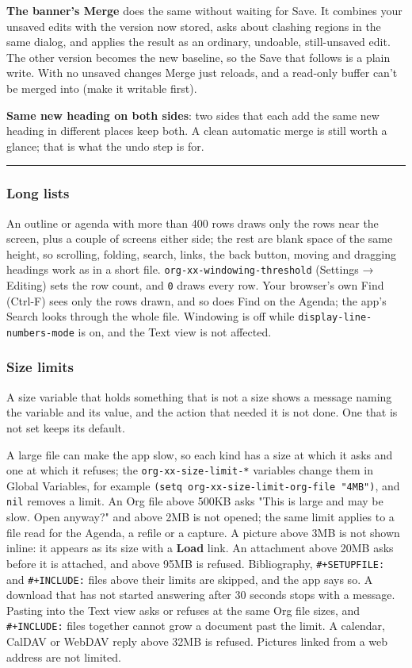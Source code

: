 \documentclass[11pt]{article}
\begin{document}
\textbf{The banner's Merge} does the same without waiting for Save. It combines your unsaved edits with the version now stored, asks about clashing regions in the same dialog, and applies the result as an ordinary, undoable, still-unsaved edit. The other version becomes the new baseline, so the Save that follows is a plain write. With no unsaved changes Merge just reloads, and a read-only buffer can't be merged into (make it writable first).

\textbf{Same new heading on both sides}: two sides that each add the same new heading in different places keep both. A clean automatic merge is still worth a glance; that is what the undo step is for.

\noindent\rule{\textwidth}{0.5pt}

\subsubsection{Long lists}
\label{sec:orgff76d85}
An outline or agenda with more than 400 rows draws only the rows near the screen, plus a couple of screens either side; the rest are blank space of the same height, so scrolling, folding, search, links, the back button, moving and dragging headings work as in a short file. \texttt{org-xx-windowing-threshold} (Settings → Editing) sets the row count, and \texttt{0} draws every row. Your browser's own Find (Ctrl-F) sees only the rows drawn, and so does Find on the Agenda; the app's Search looks through the whole file. Windowing is off while \texttt{display-line-numbers-mode} is on, and the Text view is not affected.

\subsubsection{Size limits}
\label{sec:orgd916704}
A size variable that holds something that is not a size shows a message naming the variable and its value, and the action that needed it is not done. One that is not set keeps its default.

A large file can make the app slow, so each kind has a size at which it asks and one at which it refuses; the \texttt{org-xx-size-limit-*} variables change them in Global Variables, for example \texttt{(setq org-xx-size-limit-org-file "4MB")}, and \texttt{nil} removes a limit. An Org file above 500KB asks "This is large and may be slow. Open anyway?" and above 2MB is not opened; the same limit applies to a file read for the Agenda, a refile or a capture. A picture above 3MB is not shown inline: it appears as its size with a \textbf{Load} link. An attachment above 20MB asks before it is attached, and above 95MB is refused. Bibliography, \texttt{\#+SETUPFILE:} and \texttt{\#+INCLUDE:} files above their limits are skipped, and the app says so. A download that has not started answering after 30 seconds stops with a message. Pasting into the Text view asks or refuses at the same Org file sizes, and \texttt{\#+INCLUDE:} files together cannot grow a document past the limit. A calendar, CalDAV or WebDAV reply above 32MB is refused. Pictures linked from a web address are not limited.
\end{document}
